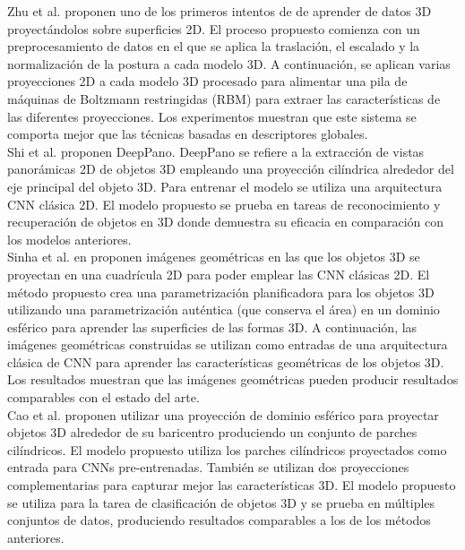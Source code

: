Zhu et al. \cite{zhu2016deep} proponen uno de los primeros intentos de de aprender de datos 3D proyectándolos sobre superficies 2D. El proceso propuesto comienza con un preprocesamiento de datos en el que se aplica la traslación, el escalado y la normalización de la postura a cada modelo 3D. A continuación, se aplican varias proyecciones 2D a cada modelo 3D procesado para alimentar una pila de máquinas de Boltzmann restringidas (RBM) para extraer las características de las diferentes proyecciones. Los experimentos muestran que este sistema se comporta mejor que las técnicas basadas en descriptores globales.\\

Shi et al. \cite{shi2015deeppano} proponen DeepPano. DeepPano se refiere a la extracción de vistas panorámicas 2D de objetos 3D empleando una proyección cilíndrica alrededor del eje principal del objeto 3D. Para entrenar el modelo se utiliza una arquitectura CNN clásica 2D. El modelo propuesto se prueba en tareas de reconocimiento y recuperación de objetos en 3D donde demuestra su eficacia en comparación con los modelos anteriores.\\

Sinha et al. en \cite{sinha2016deep} proponen imágenes geométricas en las que los objetos 3D se proyectan en una cuadrícula 2D para poder emplear las CNN clásicas 2D. El método propuesto crea una parametrización planificadora para los objetos 3D utilizando una parametrización auténtica (que conserva el área) en un dominio esférico para aprender las superficies de las formas 3D. A continuación, las imágenes geométricas construidas se utilizan como entradas de una arquitectura clásica de CNN para aprender las características geométricas de los objetos 3D. Los resultados muestran que las imágenes geométricas pueden producir resultados comparables con el estado del arte.\\

Cao et al. \cite{cao20173d} proponen utilizar una proyección de dominio esférico para proyectar objetos 3D alrededor de su baricentro produciendo un conjunto de parches cilíndricos. El modelo propuesto utiliza los parches cilíndricos proyectados como entrada para CNNs pre-entrenadas. También se utilizan dos proyecciones complementarias para capturar mejor las características 3D. El modelo propuesto se utiliza para la tarea de clasificación de objetos 3D y se prueba en múltiples conjuntos de datos, produciendo resultados comparables a los de los métodos anteriores.\\

